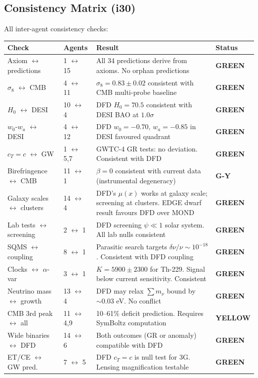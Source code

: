 \documentclass[11pt,a4paper]{article}
\newcommand{\GREEN}{\textcolor{dfdgreen}{\textbf{GREEN}}}
\newcommand{\YELLOW}{\textcolor{dfdyellow}{\textbf{YELLOW}}}
\newcommand{\GY}{\textcolor{dfdgy}{\textbf{G-Y}}}
\begin{document}
\subsection{Consistency Matrix (i30)}

All inter-agent consistency checks:

\begin{center}
\begin{longtable}{p{3cm}p{3cm}p{5cm}l}
\toprule
\textbf{Check} & \textbf{Agents} & \textbf{Result} & \textbf{Status} \\
\midrule
\endfirsthead
Axiom $\leftrightarrow$ predictions & 1 $\leftrightarrow$ 15 & All 34 predictions derive from axioms. No orphan predictions & \GREEN \\
$\sigma_8$ $\leftrightarrow$ CMB & 4 $\leftrightarrow$ 11 & $\sigma_8 = 0.83 \pm 0.02$ consistent with CMB multi-probe baseline & \GREEN \\
$H_0$ $\leftrightarrow$ DESI & 10 $\leftrightarrow$ 4 & DFD $H_0 = 70.5$ consistent with DESI BAO at $1.0\sigma$ & \GREEN \\
$w_0$-$w_a$ $\leftrightarrow$ DESI & 4 $\leftrightarrow$ 12 & DFD $w_0 = -0.70$, $w_a = -0.85$ in DESI favoured quadrant & \GREEN \\
$c_T = c$ $\leftrightarrow$ GW & 1 $\leftrightarrow$ 5,7 & GWTC-4 GR tests: no deviation. Consistent with DFD & \GREEN \\
Birefringence $\leftrightarrow$ CMB & 11 $\leftrightarrow$ 1 & $\beta = 0$ consistent with current data (instrumental degeneracy) & \GY \\
Galaxy scales $\leftrightarrow$ clusters & 14 $\leftrightarrow$ 4 & DFD's $\mu(x)$ works at galaxy scale; screening at clusters. EDGE dwarf result favours DFD over MOND & \GREEN \\
Lab tests $\leftrightarrow$ screening & 2 $\leftrightarrow$ 1 & DFD screening $\psi \ll 1$ solar system. All lab nulls consistent & \GREEN \\
SQMS $\leftrightarrow$ coupling & 8 $\leftrightarrow$ 1 & Parasitic search targets $\delta\nu/\nu \sim 10^{-18}$. Consistent with DFD coupling & \GREEN \\
Clocks $\leftrightarrow$ $\alpha$-var & 3 $\leftrightarrow$ 1 & $K = 5900 \pm 2300$ for Th-229. Signal below current sensitivity. Consistent & \GREEN \\
Neutrino mass $\leftrightarrow$ growth & 13 $\leftrightarrow$ 4 & DFD may relax $\sum m_\nu$ bound by $\sim 0.03$ eV. No conflict & \GREEN \\
CMB 3rd peak $\leftrightarrow$ all & 11 $\leftrightarrow$ 4,9 & 10--61\% deficit prediction. Requires SymBoltz computation & \YELLOW \\
Wide binaries $\leftrightarrow$ DFD & 14 $\leftrightarrow$ 6 & Both outcomes (GR or anomaly) compatible with DFD & \GREEN \\
ET/CE $\leftrightarrow$ GW pred. & 7 $\leftrightarrow$ 5 & DFD $c_T = c$ is null test for 3G. Lensing magnification testable & \GREEN \\
\bottomrule
\end{longtable}
\end{center}
\end{document}
